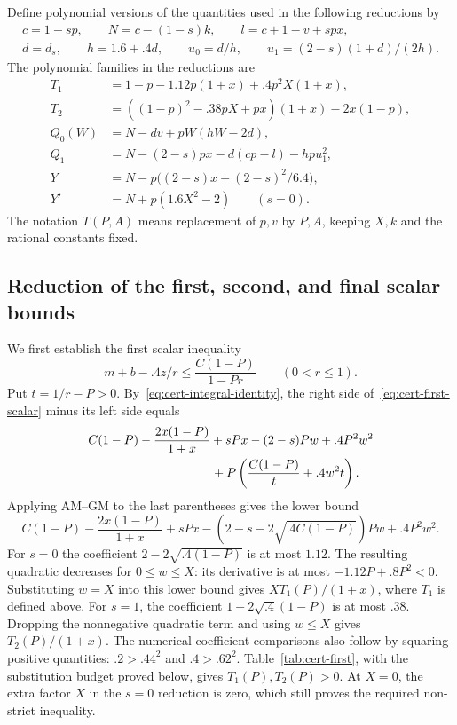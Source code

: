Define polynomial versions of the quantities used in the following reductions by
\begin{equation}
\begin{gathered}
 c=1-sp,\qquad N=c-(1-s)k,\qquad l=c+1-v+spx,\\
 d=d_s,\qquad h=1.6+.4d,\qquad
 u_0=d/h,\qquad u_1=(2-s)(1+d)/(2h).
\end{gathered}
\label{eq:cert-polynomial-notation}
\end{equation}
The polynomial families in the reductions are
\begin{align*}
 T_1&=1-p-1.12p(1+x)+.4p^2X(1+x),\\
 T_2&=((1-p)^2-.38pX+px)(1+x)-2x(1-p),\\
 Q_0(W)&=N-dv+pW(hW-2d),\\
 Q_1&=N-(2-s)px-d(cp-l)-hp u_1^2,\\
 Y&=N-p\bigl((2-s)x+(2-s)^2/6.4\bigr),\\
 Y'&=N+p(1.6X^2-2)\qquad(s=0).
\end{align*}
The notation $T(P,A)$ means replacement of $p,v$ by $P,A$, keeping
$X,k$ and the rational constants fixed.


\subsection{Reduction of the first, second, and final scalar bounds}

We first establish the first scalar inequality
\begin{equation}
 m+b-.4z/r\le\frac{C(1-P)}{1-Pr}\qquad(0<r\le1).
 \label{eq:cert-first-scalar}
\end{equation}
Put $t=1/r-P>0$.  By~\eqref{eq:cert-integral-identity}, the right
side of~\eqref{eq:cert-first-scalar} minus its left side equals
\begin{align*}
 &C(1-P)-\frac{2x(1-P)}{1+x}+sPx-(2-s)Pw+.4P^2w^2\\
 &\hspace{35mm}+P\left(\frac{C(1-P)}t+.4w^2t\right).
\end{align*}
Applying AM--GM to the last parentheses gives the lower bound
\begin{equation}
 C(1-P)-\frac{2x(1-P)}{1+x}+sPx
 -(2-s-2\sqrt{.4C(1-P)})Pw+.4P^2w^2.
 \label{eq:cert-amgm}
\end{equation}
For $s=0$ the coefficient $2-2\sqrt{.4(1-P)}$ is at most $1.12$.
The resulting quadratic decreases for $0\le w\le X$: its derivative
is at most $-1.12P+.8P^2<0$.  Substituting $w=X$ into this lower
bound gives $X T_1(P)/(1+x)$, where $T_1$ is defined above.  For
$s=1$, the coefficient $1-2\sqrt{.4}(1-P)$ is at most $.38$.
Dropping the nonnegative quadratic term and using $w\le X$ gives
$T_2(P)/(1+x)$.  The numerical coefficient comparisons also follow
by squaring positive quantities: $.2>.44^2$ and
$.4>.62^2$.  Table~\ref{tab:cert-first}, with the substitution
budget proved below, gives $T_1(P),T_2(P)>0$.
At $X=0$, the extra factor $X$ in the $s=0$ reduction is zero,
which still proves the required non-strict inequality.

